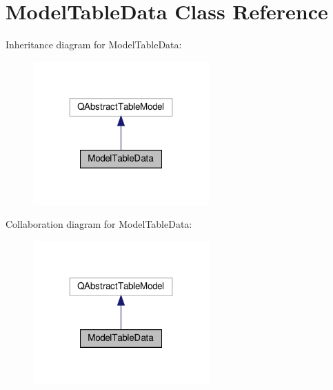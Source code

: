 \hypertarget{classModelTableData}{}\section{Model\+Table\+Data Class Reference}
\label{classModelTableData}


Inheritance diagram for Model\+Table\+Data\+:\nopagebreak
\begin{figure}[H]
\begin{center}
\leavevmode
\includegraphics[width=191pt]{classModelTableData__inherit__graph}
\end{center}
\end{figure}


Collaboration diagram for Model\+Table\+Data\+:\nopagebreak
\begin{figure}[H]
\begin{center}
\leavevmode
\includegraphics[width=191pt]{classModelTableData__coll__graph}
\end{center}
\end{figure}
